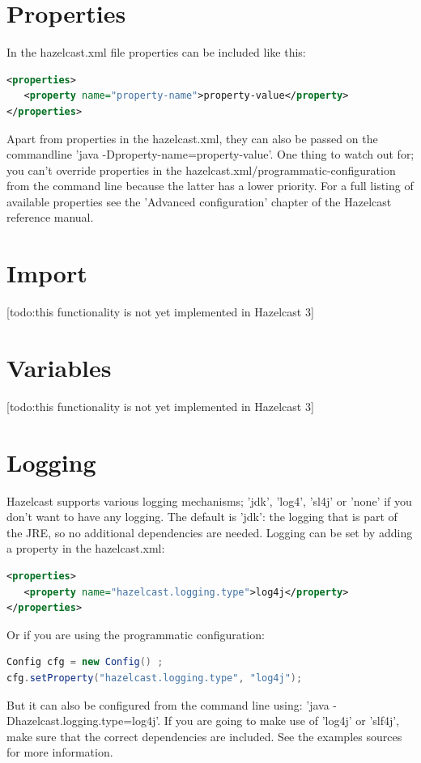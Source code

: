 \section{Properties}
In the hazelcast.xml file properties can be included like this:
\begin{lstlisting}[language=xml]
<properties>
   <property name="property-name">property-value</property>
</properties>
\end{lstlisting}
Apart from properties in the hazelcast.xml, they can also be passed on the commandline 'java -Dproperty-name=property-value'. One thing to watch out for; you can't override properties in the hazelcast.xml/programmatic-configuration from the command line because the latter has a lower priority. For a full listing of available properties see the 'Advanced configuration' chapter of the Hazelcast reference manual.

\section{Import}
[todo:this functionality is not yet implemented in Hazelcast 3]

\section{Variables}
[todo:this functionality is not yet implemented in Hazelcast 3]

\section{Logging}
Hazelcast supports various logging mechanisms; 'jdk', 'log4', 'sl4j' or 'none' if you don't want to have any logging. The default is 'jdk': the logging that is part of the JRE, so no additional dependencies are needed. Logging can be set by adding a property in the hazelcast.xml:
\begin{lstlisting}[language=xml]
<properties>
   <property name="hazelcast.logging.type">log4j</property>
</properties>
\end{lstlisting}
Or if you are using the programmatic configuration:
\begin{lstlisting}[language=java]
Config cfg = new Config() ;
cfg.setProperty("hazelcast.logging.type", "log4j");
\end{lstlisting}
But it can also be configured from the command line using: 'java -Dhazelcast.logging.type=log4j'. If you are going to make use of 'log4j' or 'slf4j', make sure that the correct dependencies are included. See the examples sources for more information.

